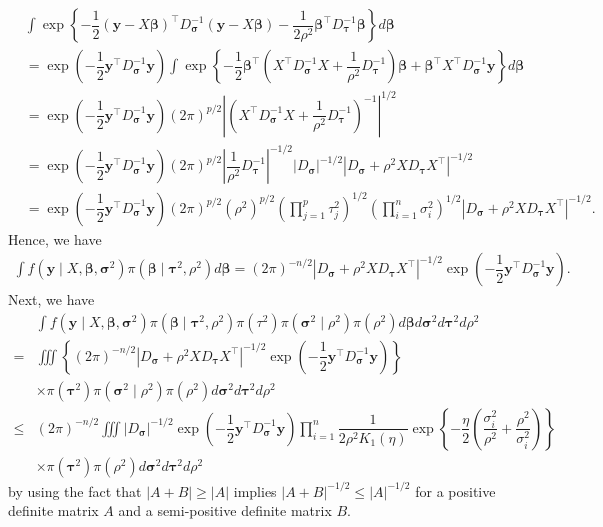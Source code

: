 \documentclass[11pt]{article}
\theoremstyle{plain}
\theoremstyle{definition}
\begin{document}
\begin{align*}
&\int\exp\left\{-\dfrac{1}{2}({\bm{y}}-X\bm\beta)^{\top}D_{\bm\sigma}^{-1}({\bm{y}}-X\bm\beta)-\dfrac{1}{2\rho^{2}}\bm{\beta}^{\top}D_{\bm\tau}^{-1}\bm\beta\right\}d\bm\beta\\
&=\exp\left(-\dfrac{1}{2}{\bm{y}}^{\top}D_{\bm\sigma}^{-1}{\bm{y}}\right)\int\exp\left\{-\dfrac{1}{2}\bm{\beta}^{\top}\left(X^{\top}D_{\bm\sigma}^{-1}X+\dfrac{1}{\rho^{2}}D_{\bm\tau}^{-1}\right)\bm{\beta}+\bm{\beta}^{\top}X^{\top}D_{\bm\sigma}^{-1}{\bm{y}}\right\}d\bm\beta\\
&=\exp\left(-\dfrac{1}{2}{\bm{y}}^{\top}D_{\bm\sigma}^{-1}{\bm{y}}\right)(2\pi)^{p/2}\left|\left(X^{\top}D_{\bm\sigma}^{-1}X+\dfrac{1}{\rho^{2}}D_{\bm\tau}^{-1}\right)^{-1}\right|^{1/2}\\
&=\exp\left(-\dfrac{1}{2}{\bm{y}}^{\top}D_{\bm\sigma}^{-1}{\bm{y}}\right)(2\pi)^{p/2}\left|\dfrac{1}{\rho^{2}}D_{\bm\tau}^{-1}\right|^{-1/2}|D_{\bm{\sigma}}|^{-1/2}|D_{\bm{\sigma}}+\rho^{2}XD_{\bm\tau}X^{\top}|^{-1/2}\\
&=\exp\left(-\dfrac{1}{2}{\bm{y}}^{\top}D_{\bm\sigma}^{-1}{\bm{y}}\right)(2\pi)^{p/2}(\rho^{2})^{p/2}\left(\prod_{j=1}^{p}\tau_{j}^{2}\right)^{1/2}\left(\prod_{i=1}^{n}\sigma_{i}^{2}\right)^{1/2}|D_{\bm{\sigma}}+\rho^{2}XD_{\bm\tau}X^{\top}|^{-1/2}.
\end{align*}
Hence, we have
\begin{align*}
\int f(\bm{y}\mid X,\bm{\beta},\bm{\sigma}^{2})\pi(\bm{\beta}\mid\bm{\tau}^{2},\rho^{2})d\bm\beta=(2\pi)^{-n/2}|D_{\bm{\sigma}}+\rho^{2}XD_{\bm\tau}X^{\top}|^{-1/2}\exp\left(-\dfrac{1}{2}{\bm{y}}^{\top}D_{\bm\sigma}^{-1}{\bm{y}}\right).
\end{align*}
Next, we have
\begin{align*}
&\int f(\bm{y}\mid X,\bm{\beta},\bm{\sigma}^{2})\pi(\bm{\beta}\mid\bm{\tau}^{2},\rho^{2})\pi({\tau}^{2})\pi(\bm{\sigma}^{2}\mid\rho^{2})\pi(\rho^{2})d\bm{\beta}d\bm{\sigma}^{2}d\bm{\tau}^{2}d\rho^{2}\\
=&\iiint\left\{(2\pi)^{-n/2}|D_{\bm{\sigma}}+\rho^{2}XD_{\bm\tau}X^{\top}|^{-1/2}\exp\left(-\dfrac{1}{2}{\bm{y}}^{\top}D_{\bm\sigma}^{-1}{\bm{y}}\right)\right\}\\
&\times \pi(\bm{\tau}^{2})\pi(\bm{\sigma}^{2}\mid\rho^{2})\pi(\rho^{2})d\bm{\sigma}^{2}d\bm{\tau}^{2}d\rho^{2}\\
\leq& (2\pi)^{-n/2}\iiint|D_{\bm{\sigma}}|^{-1/2}\exp\left(-\dfrac{1}{2}{\bm{y}}^{\top}D_{\bm\sigma}^{-1}{\bm{y}}\right) \prod_{i=1}^{n}\dfrac{1}{2\rho^2 K_1(\eta)} \exp\left\{-\dfrac{\eta}{2}\left(\dfrac{\sigma_i^2}{\rho^2}+\dfrac{\rho^2}{\sigma_i^2}\right)\right\}\\\
&\times\pi(\bm{\tau}^{2})\pi(\rho^{2})d\bm{\sigma}^{2}d\bm{\tau}^{2}d\rho^{2}
\end{align*}
by using the fact that $|A+B|\geq|A|$ implies $|A+B|^{-1/2}\leq|A|^{-1/2}$ for a positive definite matrix  $A$ and a semi-positive definite matrix $B$. 
\end{document}
